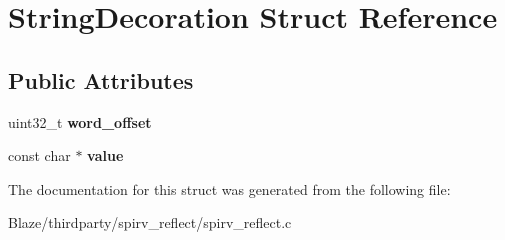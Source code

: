 \hypertarget{structStringDecoration}{}\section{String\+Decoration Struct Reference}
\label{structStringDecoration}
\subsection*{Public Attributes}
\begin{DoxyCompactItemize}
\item 
\mbox{\label{structStringDecoration_aa6d0c1e10dfa584a2ef5600e4b6591ec}} 
uint32\+\_\+t {\bfseries word\+\_\+offset}
\item 
\mbox{\label{structStringDecoration_adc10485f220892c2204c10c9ca780c4c}} 
const char $\ast$ {\bfseries value}
\end{DoxyCompactItemize}


The documentation for this struct was generated from the following file\+:\begin{DoxyCompactItemize}
\item 
Blaze/thirdparty/spirv\+\_\+reflect/spirv\+\_\+reflect.\+c\end{DoxyCompactItemize}
